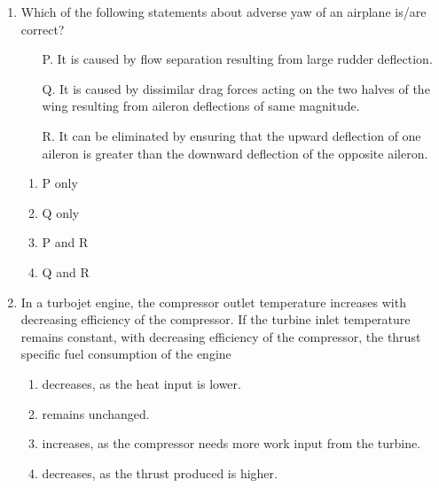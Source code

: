 \documentclass[12pt]{article}
\begin{document}
\begin{enumerate}[label=Q.\arabic*, start=26]
		\begin{multicols}{4}
			\begin{enumerate}[label=(\Alph*)]
				\item $\beta_1 > \beta_2$
				\item $\beta_1 < \beta_2$
				\item $\theta_1 > \theta_2$
				\item $\theta_1 < \theta_2$
			\end{enumerate}
		\end{multicols}

	\item Which of the following statements about adverse yaw of an airplane is/are correct?  

		\begin{itemize}
			\item[P.] It is caused by flow separation resulting from large rudder deflection.
			\item[Q.] It is caused by dissimilar drag forces acting on the two halves of the wing resulting from aileron deflections of same magnitude.
			\item[R.] It can be eliminated by ensuring that the upward deflection of one aileron is greater than the downward deflection of the opposite aileron.
		\end{itemize}

		\begin{multicols}{4}
			\begin{enumerate}[label=(\Alph*)]
				\item P only
				\item Q only
				\item P and R
				\item Q and R
			\end{enumerate}
		\end{multicols}
	\item In a turbojet engine, the compressor outlet temperature increases with decreasing efficiency of the compressor. If the turbine inlet temperature remains constant, with decreasing efficiency of the compressor, the thrust specific fuel consumption of the engine

		\begin{enumerate}[label=(\Alph*)]
			\item decreases, as the heat input is lower.
			\item remains unchanged.
			\item increases, as the compressor needs more work input from the turbine.
			\item decreases, as the thrust produced is higher.
		\end{enumerate}


\end{enumerate}
\end{document}

